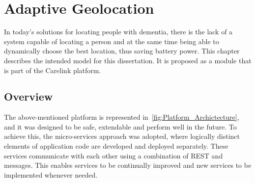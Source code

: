 
\chapter{Adaptive Geolocation}
\label{cha:Adaptive_Geolocation}

In today's solutions for locating people with dementia, there is the lack of a system capable of locating a person and at the same time being able to dynamically choose the best location, thus saving battery power. 
This chapter describes the intended model for this dissertation.
It is proposed as a module that is part of the Carelink platform.


\section{Overview}
\label{sec:overview}

The above-mentioned platform is represented in~\ref{fig:Platform_Archictecture}, and it was designed to be safe, extendable and perform well in the future. To achieve this, the micro-services approach was adopted, where logically distinct elements of application code are developed and deployed separately. These services communicate with each other using a combination of REST and messages. This enables services to be continually improved and new services to be implemented whenever needed. 

